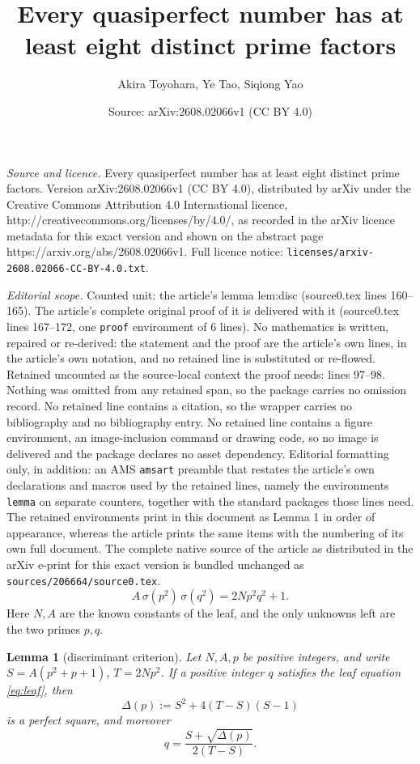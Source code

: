 \documentclass[10pt,a4paper]{amsart}
\title{Every quasiperfect number has at least eight distinct prime factors}
\author{Akira Toyohara, Ye Tao, Siqiong Yao}
\date{Source: arXiv:2608.02066v1 (CC BY 4.0)}
\newtheorem{lemma}{Lemma}
\begin{document}
\maketitle

\noindent\emph{Source and licence.} Every quasiperfect number has at least eight distinct prime factors. Version arXiv:2608.02066v1 (CC BY 4.0), distributed by arXiv under the Creative Commons Attribution 4.0 International licence, http://creativecommons.org/licenses/by/4.0/, as recorded in the arXiv licence metadata for this exact version and shown on the abstract page https://arxiv.org/abs/2608.02066v1. Full licence notice: \texttt{licenses/arxiv-2608.02066-CC-BY-4.0.txt}.\par\smallskip

\noindent\textit{Editorial scope.} Counted unit: the article's lemma lem:disc (source0.tex lines 160--165). The article's complete original proof of it is delivered with it (source0.tex lines 167--172, one \texttt{proof} environment of 6 lines). No mathematics is written, repaired or re-derived: the statement and the proof are the article's own lines, in the article's own notation, and no retained line is substituted or re-flowed.  Retained uncounted as the source-local context the proof needs: lines 97--98.  Nothing was omitted from any retained span, so the package carries no omission record.  No retained line contains a citation, so the wrapper carries no bibliography and no bibliography entry.  No retained line contains a figure environment, an image-inclusion command or drawing code, so no image is delivered and the package declares no asset dependency.  Editorial formatting only, in addition: an AMS \texttt{amsart} preamble that restates the article's own declarations and macros used by the retained lines, namely the environments \texttt{lemma} on separate counters, together with the standard packages those lines need.  The retained environments print in this document as Lemma 1 in order of appearance, whereas the article prints the same items with the numbering of its own full document.  The complete native source of the article as distributed in the arXiv e-print for this exact version is bundled unchanged as \texttt{sources/206664/source0.tex}.
\begin{equation} A\,\sigma(p^2)\,\sigma(q^2) = 2Np^2q^2 + 1. \label{eq:leaf}
\end{equation} Here $N, A$ are the known constants of the leaf, and the only unknowns left are the two primes $p, q$.

\begin{lemma}[discriminant criterion]\label{lem:disc} Let $N, A, p$ be positive integers, and write $S = A(p^2 + p + 1)$, $T = 2Np^2$. If a positive integer $q$ satisfies the leaf equation \eqref{eq:leaf}, then
\[ \Delta(p) := S^2 + 4(T - S)(S - 1)
\] is a perfect square, and moreover
\begin{equation} q = \frac{S + \sqrt{\Delta(p)}}{2(T - S)}. \label{eq:qformula}
\end{equation}
\end{lemma}
\end{document}
